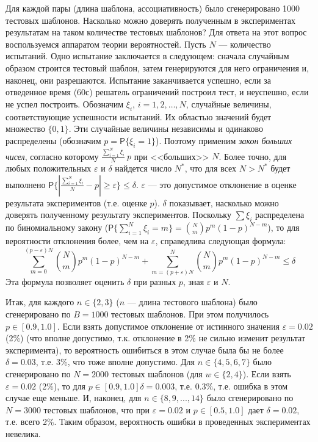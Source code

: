Для каждой пары (длина шаблона, ассоциативность) было сгенерировано 1000
тестовых шаблонов. Насколько можно доверять полученным в экспериментах
результатам на таком количестве тестовых шаблонов? Для ответа на этот вопрос воспользуемся аппаратом теории
вероятностей. Пусть $N$ --- количество испытаний. Одно испытание заключается в
следующем: сначала случайным образом строится тестовый шаблон, затем генерируются
для него ограничения и, наконец, они разрешаются. Испытание заканчивается успешно, если за отведенное время (60с) решатель ограничений построил тест, и неуспешно, если не успел построить.
Обозначим  $\xi_i$, $i = 1, 2, \dots, N$, случайные величины, соответствующие
успешности испытаний. Их областью значений будет множество $\{0, 1\}$. Эти
случайные величины независимы и одинаково распределены (обозначим $p =
\mathsf{P}\{\xi_i = 1\}$). Поэтому применим \emph{закон больших чисел}, согласно
которому $\frac{\sum_{i=1}^N \xi_i}{N} ~ p$ при <<больших>> $N$. Более точно, для любых
положительных $\varepsilon$ и $\delta$ найдется число $N^*$, что для всех $N > N^*$ будет
выполнено $\mathsf{P}\{|\frac{\sum_{i=1}^N \xi_i}{N} - p | \geq \varepsilon\} \leq \delta$. $\varepsilon$ --- это допустимое отклонение в оценке результата экспериментов (т.е. оценке $p$). $\delta$ показывает, насколько можно доверять полученному результату экспериментов. Поскольку $\sum \xi_i$ распределена по биномиальному закону ($\mathsf{P}\{\sum_{i=1}^N \xi_i = m\} = \binom{N}{m} p^m (1{-}p)^{N{-}m}$), то для вероятности отклонения более, чем на $\varepsilon$, справедлива следующая формула: $$\sum_{m = 0}^{(p-\varepsilon)N} \binom{N}{m} p^m (1{-}p)^{N{-}m} + \sum_{m = (p+\varepsilon)N}^N \binom{N}{m} p^m (1{-}p)^{N{-}m} \leq \delta$$ Эта формула позволяет оценить $\delta$ при разных $p$, зная $\varepsilon$ и $N$.

Итак, для каждого $n \in \{2,3\}$ ($n$ --- длина тестового шаблона) было сгенерировано по $B = 1000$ тестовых шаблонов. При этом получилось $p \in [0.9, 1.0]$. Если взять допустимое отклонение от истинного значения $\varepsilon = 0.02$ (2\%) (что вполне допустимо, т.к. отклонение в 2\% не сильно изменит результат эксперимента), то вероятность ошибиться в этом случае была бы не более $\delta = 0.03$, т.е. 3\%, что тоже вполне допустимо. Для $n \in \{4, 5, 6, 7\}$ было сгенерировано по $N = 2000$ тестовых шаблонов (для $w \in \{2,4\}$). Если взять $\varepsilon = 0.02$ (2\%), то для $p \in [0.9, 1.0] \delta = 0.003$, т.е. $0.3\%$, т.е. ошибка в этом случае еще меньше. И, наконец, для $n \in \{8, 9, ..., 14\}$ было сгенерировано по $N = 3000$ тестовых шаблонов, что при $\varepsilon = 0.02$ и $p \in [0.5, 1.0]$ дает $\delta = 0.02$, т.е. всего 2\%. Таким образом, вероятность ошибки в проведенных экспериментах невелика.

